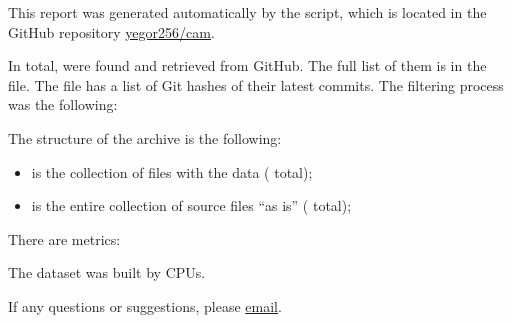 \documentclass[nobrand,nosecurity]{huawei}
\begin{document}
\maketitle

This report was generated automatically by the script, which is located in
the GitHub repository \href{https://github.com/yegor256/cam}{yegor256/cam}.

In total, \unskip{}
were found and retrieved from GitHub.
The full list of them is in the  file.
The  file has a list of Git hashes of their latest commits.
The filtering process was the following:

\begin{enumerate}
\unskip{}
\end{enumerate}

The structure of the archive is the following:

\begin{itemize}
  \item {} is the collection of  files with the data
  (\unskip{} total);
  \item {} is the entire collection of
  \unskip{}
  source files ``as is''
  (\unskip{} total);
\end{itemize}

There are \unskip{} metrics:

\begin{itemize}
  
\end{itemize}

The dataset was built by
\unskip{}
CPUs\unskip{}.

If any questions or suggestions, please \href{mailto:yegor256@gmail.com}{email}.
\end{document}
